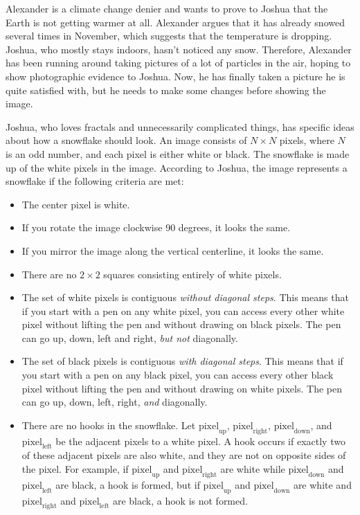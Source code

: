 
\noindent
Alexander is a climate change denier and wants to prove to Joshua that the Earth is not getting warmer at all.
Alexander argues that it has already snowed several times in November,
which suggests that the temperature is dropping. Joshua, who mostly stays indoors,
hasn't noticed any snow.
Therefore, Alexander has been running around taking pictures of a lot of particles in the air,
hoping to show photographic evidence to Joshua.
Now, he has finally taken a picture he is quite satisfied with,
but he needs to make some changes before showing the image.

Joshua, who loves fractals and unnecessarily complicated things,
has specific ideas about how a snowflake should look.
An image consists of $N \times N$ pixels, where $N$ is an odd number,
and each pixel is either white or black.
The snowflake is made up of the white pixels in the image.
According to Joshua, the image represents a snowflake if the following criteria are met:

\begin{itemize}
  \item The center pixel is white.
  \item If you rotate the image clockwise 90 degrees, it looks the same.
  \item If you mirror the image along the vertical centerline, it looks the same.
  \item There are no $2 \times 2$ squares consisting entirely of white pixels.
  \item The set of white pixels is contiguous \emph{without diagonal steps}.
    This means that if you start with a pen on any white pixel, you can
    access every other white pixel without lifting the pen and without
    drawing on black pixels.
    The pen can go up, down, left and right, \emph{but not} diagonally.
  \item The set of black pixels is contiguous \emph{with diagonal steps}.
    This means that if you start with a pen on any black pixel, you can
    access every other black pixel without lifting the pen and without
    drawing on white pixels.
    The pen can go up, down, left, right, \emph{and} diagonally.
  \item There are no hooks in the snowflake.
  Let $\text{pixel}_\text{up}$, $\text{pixel}_\text{right}$, $\text{pixel}_\text{down}$,
  and $\text{pixel}_\text{left}$ be the adjacent pixels to a white pixel.
  A hook occurs if exactly two of these adjacent pixels are also white,
  and they are not on opposite sides of the pixel.
  For example, if $\text{pixel}_\text{up}$ and $\text{pixel}_\text{right}$ are white while
  $\text{pixel}_\text{down}$ and $\text{pixel}_\text{left}$ are black, a hook is formed,
  but if $\text{pixel}_\text{up}$ and $\text{pixel}_\text{down}$ are white
  and $\text{pixel}_\text{right}$ and $\text{pixel}_\text{left}$ are black, a hook is not formed.

\end{itemize}


